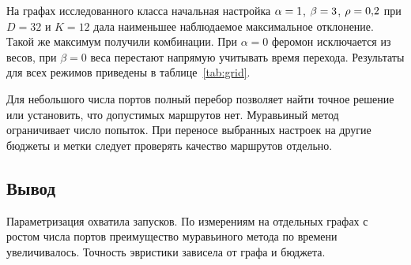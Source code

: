 На графах исследованного класса начальная настройка $\alpha=1$, $\beta=3$, $\rho=0{,}2$ при $D=32$ и $K=12$ дала наименьшее наблюдаемое максимальное отклонение. Такой же максимум получили \BestTies{} комбинации. При $\alpha=0$ феромон исключается из весов, при $\beta=0$ веса перестают напрямую учитывать время перехода. Результаты для всех режимов приведены в таблице~\ref{tab:grid}.

Для небольшого числа портов полный перебор позволяет найти точное решение или установить, что допустимых маршрутов нет. Муравьиный метод ограничивает число попыток. При переносе выбранных настроек на другие бюджеты и метки следует проверять качество маршрутов отдельно.

\subsection*{Вывод}

Параметризация охватила \TotalAntRuns{} запусков. По измерениям на отдельных графах с ростом числа портов преимущество муравьиного метода по времени увеличивалось. Точность эвристики зависела от графа и бюджета.
